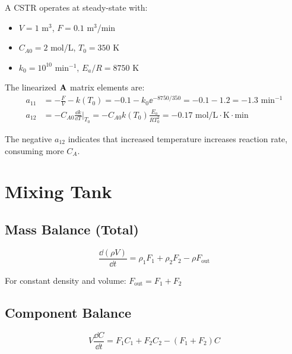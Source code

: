 \begin{examplebox}[title=Example 1.12: CSTR Linearization]
A CSTR operates at steady-state with:
\begin{itemize}
    \item $V = 1$ m$^3$, $F = 0.1$ m$^3$/min
    \item $C_{A0} = 2$ mol/L, $T_0 = 350$ K
    \item $k_0 = 10^{10}$ min$^{-1}$, $E_a/R = 8750$ K
\end{itemize}

The linearized $\mathbf{A}$ matrix elements are:
\begin{align}
a_{11} &= -\frac{F}{V} - k(T_0) = -0.1 - k_0\ee^{-8750/350} = -0.1 - 1.2 = -1.3 \text{ min}^{-1} \\
a_{12} &= -C_{A0}\frac{\dd k}{\dd T}\bigg|_{T_0} = -C_{A0}k(T_0)\frac{E_a}{RT_0^2} = -0.17 \text{ mol/L$\cdot$K$\cdot$min}
\end{align}

The negative $a_{12}$ indicates that increased temperature increases reaction rate, consuming more $C_A$.
\end{examplebox}

\section{Mixing Tank}
\label{sec:mixing}



\subsection{Mass Balance (Total)}

\begin{equation}
\frac{\dd(\rho V)}{\dd t} = \rho_1 F_1 + \rho_2 F_2 - \rho F_{\text{out}}
\end{equation}

For constant density and volume: $F_{\text{out}} = F_1 + F_2$

\subsection{Component Balance}

\begin{equation}
V\frac{\dd C}{\dd t} = F_1 C_1 + F_2 C_2 - (F_1 + F_2)C
\end{equation}


